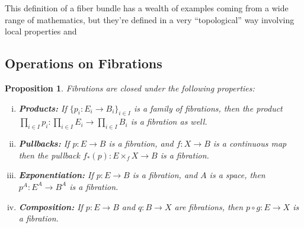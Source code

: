 \documentclass[12pt]{article}
\newtheorem{proposition}[definition]{Proposition}
\begin{document}
This definition of a fiber bundle has a wealth of examples coming from a wide range of mathematics, but they're defined in a very ``topological'' way involving local properties and 

\subsection{Operations on Fibrations}
\begin{proposition}
  Fibrations are closed under the following properties:
  \begin{enumerate}[(i)]
    \item \textbf{Products:} If $\{p_i : E_i \to B_i\}_{i\in I}$ is a family of fibrations, then the product $\prod_{i\in I} p_i : \prod_{i\in I} E_i \to \prod_{i\in I} B_i$ is a fibration as well.
    \item \textbf{Pullbacks:} If $p: E \to B$ is a fibration, and $f : X \to B$ is a continuous map then the pullback $f_*(p) : E\times_f X \to B$ is a fibration.
    \item \textbf{Exponentiation:} If $p : E \to B$ is a fibration, and $A$ is a space, then $p^A : E^A \to B^A$ is a fibration.
    \item \textbf{Composition:} If $p : E \to B$ and $q : B \to X$ are fibrations, then $p\circ g : E \to X$ is a fibration.
  \end{enumerate}
\end{proposition}
\end{document}
